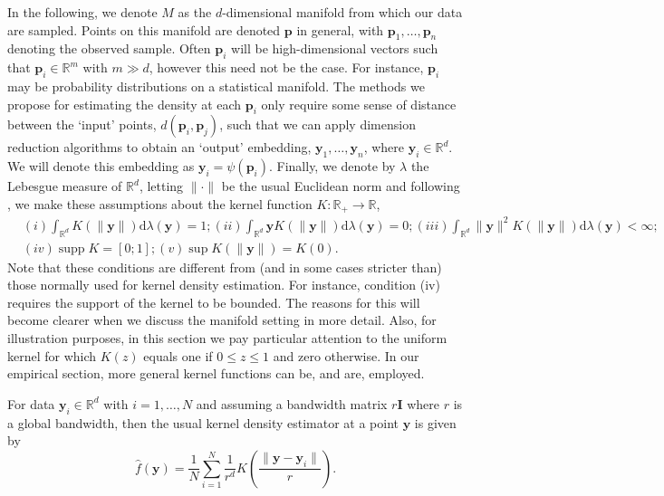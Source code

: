 \documentclass[11pt,a4paper,]{article}
\DeclareMathOperator\supp{supp}
\begin{document}
In the following, we denote \(M\) as the \(d\)-dimensional manifold from which our data are sampled. Points on this manifold are denoted \(\pmb{p}\) in general, with \(\pmb{p}_1,\dots,\pmb{p}_n\) denoting the observed sample. Often \(\pmb{p}_i\) will be high-dimensional vectors such that \(\pmb{p}_i\in\mathbb{R}^m\) with \(m\gg d\), however this need not be the case. For instance, \(\pmb{p}_i\) may be probability distributions on a statistical manifold. The methods we propose for estimating the density at each \(\pmb{p}_i\) only require some sense of distance between the `input' points, \(d(\pmb{p}_i,\pmb{p}_j)\), such that we can apply dimension reduction algorithms to obtain an `output' embedding, \(\pmb{y}_1,\dots,\pmb{y}_n\), where \(\pmb{y}_i\in\mathbb{R}^d\). We will denote this embedding as \(\pmb{y}_i=\psi(\pmb{p}_i)\). Finally, we denote by \(\lambda\) the Lebesgue measure of \(\mathbb{R}^d\), letting \(\|\cdot\|\) be the usual Euclidean norm and following \textcite{Pelletier2005-vu}, we make these assumptions about the kernel function \(K:\mathbb{R}_+\rightarrow\mathbb{R}\),
\begin{align}
\label{eq:kernelcondition}
& (i) \int_{\mathbb{R}^{d}} K(\|\pmb{y}\|) \mathrm{d} \lambda(\pmb{y})=1;
(ii) \int_{\mathbb{R}^{d}} \pmb{y} K(\|\pmb{y}\|) \mathrm{d} \lambda(\pmb{y})=0;
(iii) \int_{\mathbb{R}^{d}}\|\pmb{y}\|^{2} K(\|\pmb{y}\|) \mathrm{d} \lambda(\pmb{y})<\infty; \\
& (iv) \supp K=[0; 1];
(v) \sup K(\|\pmb{y}\|)=K(0).
\end{align}
Note that these conditions are different from (and in some cases stricter than) those normally used for kernel density estimation. For instance, condition (iv) requires the support of the kernel to be bounded. The reasons for this will become clearer when we discuss the manifold setting in more detail. Also, for illustration purposes, in this section we pay particular attention to the uniform kernel for which \(K(z)\) equals one if \(0\leq z\leq1\) and zero otherwise. In our empirical section, more general kernel functions can be, and are, employed.

For data \(\pmb{y}_i\in\mathbb{R}^d\) with \(i=1,\dots,N\) and assuming a bandwidth matrix \(r\pmb{I}\) where \(r\) is a global bandwidth, then the usual kernel density estimator at a point \(\pmb{y}\) is given by
\begin{equation}
\label{eq:vkde}
\hat{f}(\pmb{y})=\frac{1}{N}\sum\limits_{i=1}^N \frac{1}{r^d} K\left(\frac{\|\pmb{y}-\pmb{y}_i\|}{r}\right).
\end{equation}
\end{document}
